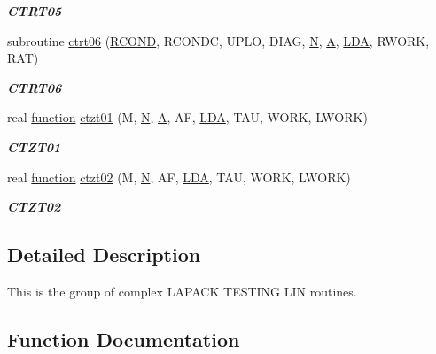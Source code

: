 \begin{DoxyCompactItemize}
\begin{DoxyCompactList}\small\item\em {\bfseries C\+T\+R\+T05} \end{DoxyCompactList}\item 
subroutine \hyperlink{group__complex__lin_gaa87b12ab9daf022d2d1732ba3afce9a7}{ctrt06} (\hyperlink{superlu__enum__consts_8h_af00a42ecad444bbda75cde1b64bd7e72a9b5c151728d8512307565994c89919d5}{R\+C\+O\+N\+D}, R\+C\+O\+N\+D\+C, U\+P\+L\+O, D\+I\+A\+G, \hyperlink{polmisc_8c_a0240ac851181b84ac374872dc5434ee4}{N}, \hyperlink{classA}{A}, \hyperlink{example__user_8c_ae946da542ce0db94dced19b2ecefd1aa}{L\+D\+A}, R\+W\+O\+R\+K, R\+A\+T)
\begin{DoxyCompactList}\small\item\em {\bfseries C\+T\+R\+T06} \end{DoxyCompactList}\item 
real \hyperlink{afunc_8m_a7b5e596df91eadea6c537c0825e894a7}{function} \hyperlink{group__complex__lin_gaa738657cde4e8770ab6e9bcb21f51998}{ctzt01} (M, \hyperlink{polmisc_8c_a0240ac851181b84ac374872dc5434ee4}{N}, \hyperlink{classA}{A}, A\+F, \hyperlink{example__user_8c_ae946da542ce0db94dced19b2ecefd1aa}{L\+D\+A}, T\+A\+U, W\+O\+R\+K, L\+W\+O\+R\+K)
\begin{DoxyCompactList}\small\item\em {\bfseries C\+T\+Z\+T01} \end{DoxyCompactList}\item 
real \hyperlink{afunc_8m_a7b5e596df91eadea6c537c0825e894a7}{function} \hyperlink{group__complex__lin_ga4de9e128786190723acc10837fc1fdf4}{ctzt02} (M, \hyperlink{polmisc_8c_a0240ac851181b84ac374872dc5434ee4}{N}, A\+F, \hyperlink{example__user_8c_ae946da542ce0db94dced19b2ecefd1aa}{L\+D\+A}, T\+A\+U, W\+O\+R\+K, L\+W\+O\+R\+K)
\begin{DoxyCompactList}\small\item\em {\bfseries C\+T\+Z\+T02} \end{DoxyCompactList}\end{DoxyCompactItemize}


\subsection{Detailed Description}
This is the group of complex L\+A\+P\+A\+C\+K T\+E\+S\+T\+I\+N\+G L\+I\+N routines. 

\subsection{Function Documentation}
\hypertarget{group__complex__lin_ga87bc5eca56916f20bb104be3e18bcda0}{}
